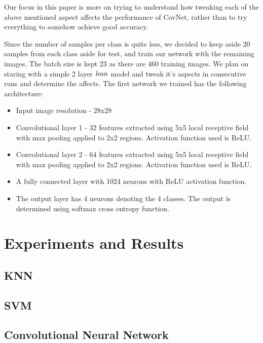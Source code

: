 \documentclass{article} %
\begin{document}
Our focus in this paper is more on trying to understand how tweaking each of the above mentioned aspect affects the performance of CovNet, rather than to try everything to somehow achieve good accuracy.
\par Since the number of samples per class is quite less, we decided to keep aside 20 samples from each class aside for test, and train our network with the remaining images. The batch size is kept 23 as there are 460 training images. We plan on staring with a simple 2 layer $\it{lean}$ model and tweak it's aspects in consecutive runs and determine the affects. The first network we trained has the following architecture:
\begin{itemize}
		\item 
		Input image resolution - 28x28
		\item
		Convolutional layer 1 - 32 features extracted using 5x5 local receptive field with max pooling applied to 2x2 regions. Activation function used is ReLU.
		\item
		Convolutional layer 2 - 64 features extracted using 5x5 local receptive field with max pooling applied to 2x2 regions. Activation function used is ReLU.
		\item
		A fully connected layer with 1024 neurons with ReLU activation function.
		\item
		The output layer has 4 neurons denoting the 4 classes. The output is determined using softmax cross entropy function.
				
\end{itemize}



\section{Experiments and Results}

\subsection{KNN}


\subsection{SVM}


\subsection{Convolutional Neural Network}
\end{document}
